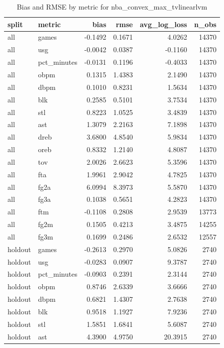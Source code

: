 \begin{table}
\caption{Bias and RMSE by metric for nba_convex_max_tvlinearlvm}
\label{tab:nba_convex_max_tvlinearlvm_bias_rmse}
\begin{tabular}{llrrrr}
\toprule
split & metric & bias & rmse & avg\_log\_loss & n\_obs \\
\midrule
all & games & -0.1492 & 0.1671 & 4.0262 & 14370 \\
all & usg & -0.0042 & 0.0387 & -0.1160 & 14370 \\
all & pct\_minutes & -0.0131 & 0.1196 & -0.4033 & 14370 \\
all & obpm & 0.1315 & 1.4383 & 2.1490 & 14370 \\
all & dbpm & 0.1010 & 0.8231 & 1.5634 & 14370 \\
all & blk & 0.2585 & 0.5101 & 3.7534 & 14370 \\
all & stl & 0.8223 & 1.0525 & 3.4839 & 14370 \\
all & ast & 1.3079 & 2.2163 & 7.1898 & 14370 \\
all & dreb & 3.6800 & 4.8540 & 5.9834 & 14370 \\
all & oreb & 0.8332 & 1.2140 & 4.8087 & 14370 \\
all & tov & 2.0026 & 2.6623 & 5.3596 & 14370 \\
all & fta & 1.9961 & 2.9042 & 4.7825 & 14370 \\
all & fg2a & 6.0994 & 8.3973 & 5.5870 & 14370 \\
all & fg3a & 0.1038 & 0.5651 & 4.2823 & 14370 \\
all & ftm & -0.1108 & 0.2808 & 2.9539 & 13773 \\
all & fg2m & 0.1505 & 0.4213 & 3.4875 & 14255 \\
all & fg3m & 0.1699 & 0.2486 & 2.6532 & 12557 \\
holdout & games & -0.2613 & 0.2970 & 5.0826 & 2740 \\
holdout & usg & -0.0283 & 0.0907 & 9.3787 & 2740 \\
holdout & pct\_minutes & -0.0903 & 0.2391 & 2.3144 & 2740 \\
holdout & obpm & 0.8746 & 2.6339 & 3.6666 & 2740 \\
holdout & dbpm & 0.6821 & 1.4307 & 2.7638 & 2740 \\
holdout & blk & 0.9518 & 1.1927 & 7.9236 & 2740 \\
holdout & stl & 1.5851 & 1.6841 & 5.6087 & 2740 \\
holdout & ast & 4.3900 & 4.9750 & 20.3915 & 2740 \\

\end{tabular}
\end{table}
